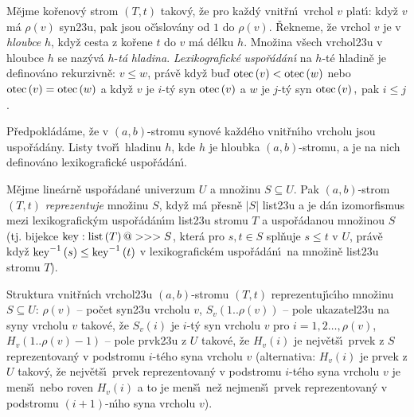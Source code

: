 \flushpar M\v ejme ko\v renov\'y strom $\left(T,t\right)$ takov\'y, \v ze pro ka\v zd\'y 
vnit\v rn\'\i\ vrchol $v$ plat\'\i :\newline 
kdy\v z $v$ m\'a $\rho \left(v\right)$ syn\accent23u, pak jsou o\v c\'\i slov\'any od $
1$ do 
$\rho \left(v\right)$. \v Rekne\-me, \v ze vrchol $v$ je v \emph{hloubce} $h$, kdy\v z 
cesta z ko\v rene $t$ do $v$ m\'a d\'elku $h$. Mno\v zina v\v sech 
vrchol\accent23u v hloubce $h$ se naz\'yv\'a $h$-\emph{t\'a} 
\emph{hladina}. \emph{Lexikografick\'e} \emph{uspo\v r\'ad\'an\'\i} 
na $h$-t\'e hladin\v e je definov\'ano rekurzivn\v e:\newline 
\newline 
$v\le w$, pr\'av\v e kdy\v z bu\v d $\operatorname{otec}\left(v\right)<\operatorname{otec}\left(w\right)$ nebo 
$\operatorname{otec}\left(v\right)=\operatorname{otec}\left(w\right)$ a kdy\v z $v$ je $i$-t\'y syn $\operatorname{otec}\left(v\right)$ a $w$ je 
$j$-t\'y syn $\operatorname{otec}\left(v\right),$ pak $i\le j$.  
\medskip

\flushpar P\v redpokl\'ad\'ame, \v ze v $\left(a,b\right)$-stromu  
synov\'e ka\v zd\'eho vnit\v rn\'\i ho vrcholu jsou uspo\v r\'ad\'any. Listy 
tvo\v r\'\i\ hladinu $h$, kde $h$ je hloub\-ka $\left(a,b\right)$-stromu, a je na nich 
definov\'ano lexikografick\'e uspo\v r\'a\-d\'a\-n\'\i .
\medskip

\flushpar M\v ejme line\'arn\v e uspo\v r\'adan\'e univerzum $U$ a 
mno\v zinu $S\subseteq U$.  Pak $\left(a,b\right)$-strom $\left(T,t\right)$ 
\emph{reprezentuje} mno\v zinu $S$, kdy\v z m\'a p\v resn\v e $|S
|$ 
list\accent23u a je d\'an izomorfismus mezi lexikografick\'ym uspo\v r\'a\-d\'a\-n\'\i m 
list\accent23u stromu $T$ a uspo\v r\'adanou mno\v zinou $S$ 
(tj.  bijekce $\operatorname{key}:\operatorname{list}\left(T\right)@>>>S$, kter\'a pro $s,t\in S$ 
spl\v nuje $s\le t$ v $U$, pr\'av\v e kdy\v z $\operatorname{key}^{-1}\left(s\right)\le\operatorname{key}^{
-1}\left(t\right)$ v 
lexikografick\'em uspo\v r\'ad\'an\'\i\ na mno\v zin\v e list\accent23u 
stromu $T$).  
\medskip

\flushpar Struktura vnit\v rn\'\i ch vrchol\accent23u 
$\left(a,b\right)$-stromu $\left(T,t\right)$ reprezentuj\'\i c\'\i\-ho mno\v zinu 
$S\subseteq U$:\newline 
$\rho \left(v\right)$ -- po\v cet syn\accent23u vrcholu $v$,\newline 
$S_v\left(1..\rho \left(v\right)\right)$ -- pole ukazatel\accent23u na syny vrcholu $v$ takov\'e, 
\v ze $S_v\left(i\right)$ je $i$-t\'y syn vrcholu $v$ pro 
$i=1,2\dots,\rho \left(v\right)$,\newline 
$H_v\left(1..\rho \left(v\right)-1\right)$ -- pole prvk\accent23u z $U$ takov\'e, \v ze $
H_v\left(i\right)$ 
je nejv\v et\v s\'\i\ prvek z $S$ reprezentovan\'y v podstromu 
$i$-t\'eho syna vrcholu $v$ (alternativa: $H_v\left(i\right)$ je prvek z $U$ 
takov\'y, \v ze nejv\v et\v s\'\i\ prvek reprezentovan\'y v podstromu $
i$-t\'eho 
syna vrcholu $v$ je men\v s\'\i\ nebo roven $H_v\left(i\right)$ a to je men\v s\'\i\  
ne\v z nejmen\v s\'\i\ prvek reprezentovan\'y v podstromu $\left(i+1\right)$-n\'\i ho 
syna vrcholu $v$).
\medskip

